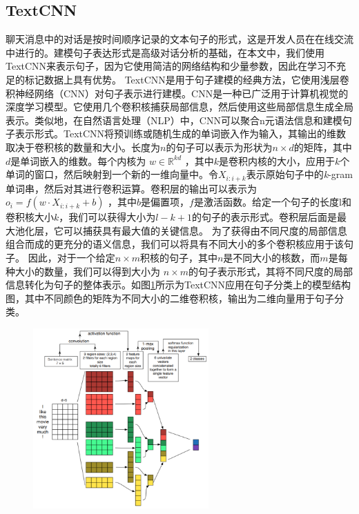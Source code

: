 \subsection{TextCNN}
聊天消息中的对话是按时间顺序记录的文本句子的形式，这是开发人员在在线交流中进行的。建模句子表达形式是高级对话分析的基础，在本文中，我们使用TextCNN\cite{kim2014convolutional}来表示句子，因为它使用简洁的网络结构和少量参数，因此在学习不充足的标记数据上具有优势。
TextCNN是用于句子建模的经典方法，它使用浅层卷积神经网络（CNN）\cite{krizhevsky2012imagenet}对句子表示进行建模。CNN是一种已广泛用于计算机视觉的深度学习模型。它使用几个卷积核捕获局部信息，然后使用这些局部信息生成全局表示。类似地，在自然语言处理（NLP）中，CNN可以聚合n元语法信息和建模句子表示形式。TextCNN将预训练或随机生成的单词嵌入作为输入，其输出的维数取决于卷积核的数量和大小。长度为$n$的句子可以表示为形状为$n\times d$的矩阵，其中$d$是单词嵌入的维数。每个内核为 $w \in \mathbb{R}^{kd}$ ，其中$k$是卷积内核的大小，应用于$k$个单词的窗口，然后映射到一个新的一维向量中。令$X_{i:i+k}$表示原始句子中的\textit{k}-gram单词串，然后对其进行卷积运算。卷积层的输出可以表示为$o_i=f(w\cdot X_{i:i+k} + b)$ ，其中$b$是偏置项，$f$是激活函数。给定一个句子的长度l和卷积核大小$k$，我们可以获得大小为$l-k+1$的句子的表示形式。卷积层后面是最大池化层，它可以捕获具有最大值的关键信息。
为了获得由不同尺度的局部信息组合而成的更充分的语义信息，我们可以将具有不同大小的多个卷积核应用于该句子。 因此，对于一个给定$n \times m$积核的句子，其中$n$是不同大小的核数，而$m$是每种大小的数量，我们可以得到大小为 $n\times m$的句子表示形式，其将不同尺度的局部信息转化为句子的整体表示。如图\ref{fig:textcnn}所示为TextCNN应用在句子分类上的模型结构图，其中不同颜色的矩阵为不同大小的二维卷积核，输出为二维向量用于句子分类。
\begin{figure}[htb]
    \centering
    \includegraphics[width=0.6\textwidth]{Img/textcnn.png}
    \label{fig:textcnn}
\end{figure}

